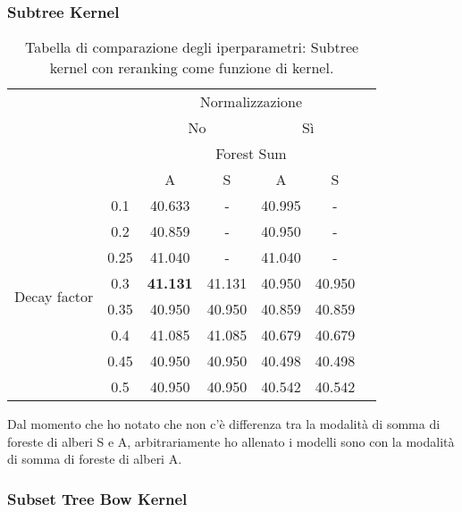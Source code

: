 \subsubsection{Subtree Kernel}

\begin{table}[H]
    \centering
    \begin{tabular}{cc|ccccc}
        \toprule
        & & \multicolumn{4}{c}{Normalizzazione}                         \\
        & & \multicolumn{2}{c}{No} & \multicolumn{2}{c}{Sì}             \\
        \hline
        & & \multicolumn{4}{c}{Forest Sum}                              \\
        & & A & S & A & S                                               \\
        \hline
        \multirow{8}{*}{\begin{sideways}Decay factor\end{sideways}} 
        & 0.1   & 40.633            & -         & 40.995    & -         \\
        & 0.2   & 40.859            & -         & 40.950    & -         \\
        & 0.25  & 41.040            & -         & 41.040    & -         \\
        & 0.3   & \textbf{41.131}   & 41.131    & 40.950    & 40.950    \\
        & 0.35  & 40.950            & 40.950    & 40.859    & 40.859    \\
        & 0.4   & 41.085            & 41.085    & 40.679    & 40.679    \\
        & 0.45  & 40.950            & 40.950    & 40.498    & 40.498    \\
        & 0.5   & 40.950            & 40.950    & 40.542    & 40.542    \\
        \bottomrule
    \end{tabular}
    \caption{Tabella di comparazione degli iperparametri: Subtree kernel con
    reranking come funzione di kernel.}
\end{table}

Dal momento che ho notato che non c'è differenza tra la modalità di somma di
foreste di alberi S e A, arbitrariamente ho allenato i modelli sono con la
modalità di somma di foreste di alberi A.

\subsubsection{Subset Tree Bow Kernel}

